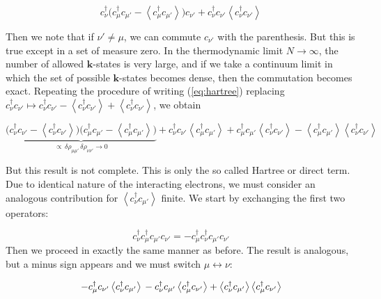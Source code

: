 \begin{equation}\label{eq:hartree}
c_{\nu}^\dagger \bigg( c_\mu^\dagger c_{\mu'} - \left\langle c_\mu^\dagger c_{\mu'} \right\rangle \bigg) c_{\nu'} + c_{\nu}^\dagger c_{\nu'} \left\langle c_\nu^\dagger c_{\nu'} \right\rangle
\end{equation}

Then we note that if $\nu' \neq \mu$, we can commute $c_{\nu'}$ with the parenthesis. But this is true except in a set of measure zero. In the thermodynamic limit $N \rightarrow \infty$, the number of allowed $\bm k$-states is very large, and if we take a continuum limit in which the set of possible $\bm k$-states becomes dense, then the commutation becomes exact. Repeating the procedure of writing (\ref{eq:hartree}) replacing $c_\nu^\dagger c_{\nu'} \mapsto c_\nu^\dagger c_{\nu'} - \left\langle c_\nu^\dagger c_{\nu'} \right\rangle + \left\langle c_\nu^\dagger c_{\nu'} \right\rangle $, we obtain

\begin{equation}\label{eq:mf}
\underbrace{\big( c_\nu^\dagger c_{\nu'} - \left\langle c_\nu^\dagger c_{\nu'} \right\rangle \big) \big( c_\mu^\dagger c_{\mu'} - \left\langle c_\mu^\dagger c_{\mu'} \right\rangle \big)}_{\propto \, \delta \rho_{\mu\mu'} \, \delta \rho_{\nu\nu'} \rightarrow 0} + c_\nu^\dagger c_{\nu'} \left\langle c_\mu^\dagger c_{\mu'} \right\rangle + c_\mu^\dagger c_{\mu'} \left\langle c_\nu^\dagger c_{\nu'} \right\rangle - \left\langle c_\mu^\dagger c_{\mu'} \right\rangle \left\langle c_\nu^\dagger c_{\nu'} \right\rangle
\end{equation}

But this result is not complete. This is only the so called Hartree or direct term. Due to identical nature of the interacting electrons, we must consider an analogous contribution for $\left\langle c_\nu^\dagger c_{\mu'} \right\rangle$ finite. We start by exchanging the first two operators: 

\begin{equation}
c_\nu^\dagger c_\mu^\dagger c_{\mu'} c_{\nu'} = - c_\mu^\dagger c_\nu^\dagger c_{\mu'} c_{\nu'}
\end{equation}
Then we proceed in exactly the same manner as before. The result is analogous, but a minus sign appears and we must switch $\mu \leftrightarrow \nu$:

\begin{equation}
- c_\mu^\dagger c_{\nu'} \left\langle c_\nu^\dagger c_{\mu'} \right\rangle \\
- c_\nu^\dagger c_{\mu'} \left\langle c_\mu^\dagger c_{\nu'} \right\rangle + \left\langle c_\nu^\dagger c_{\mu'} \right\rangle \left\langle c_\mu^\dagger c_{\nu'} \right\rangle
\end{equation}

